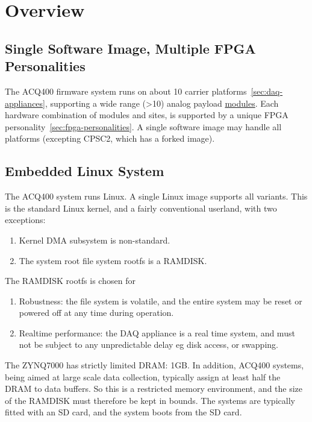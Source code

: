\documentclass[]{article}
\begin{document}
\section{Overview}

\subsection{Single Software Image, Multiple FPGA Personalities}
The ACQ400 firmware system runs on about 10 carrier platforms~\ref{sec:daq-appliances}, supporting a wide range (>10) analog payload \href{https://www.d-tacq.com/modproducts_modules.shtml}{modules}.  Each hardware combination of modules and sites, is supported by a unique FPGA personality~\ref{sec:fpga-personalities}. A single software image may handle all platforms (excepting CPSC2, which has a forked image).

\subsection{Embedded Linux System}
The ACQ400 system runs Linux. A single Linux image supports all variants. This is the standard Linux kernel, and a fairly conventional userland, with two exceptions:
\begin{enumerate}
    \item Kernel DMA subsystem is non-standard.
    \item The system root file system rootfs is a RAMDISK. 
\end{enumerate} 

The RAMDISK rootfs is chosen for 
\begin{enumerate}
    \item Robustness: the file system is volatile, and the entire system may be reset or powered off at any time during operation. 
    \item Realtime performance: the DAQ appliance is a real time system, and must not be subject to any unpredictable delay eg disk access, or swapping.
\end{enumerate} 
The ZYNQ7000 has strictly limited DRAM: 1GB. In addition, ACQ400 systems, being aimed at large scale data collection, typically assign at least half the DRAM to data buffers. So this is a restricted memory environment, and the size of the RAMDISK must therefore be kept in bounds.
The systems are typically fitted with an SD card, and the system boots from the SD card.
\end{document}
